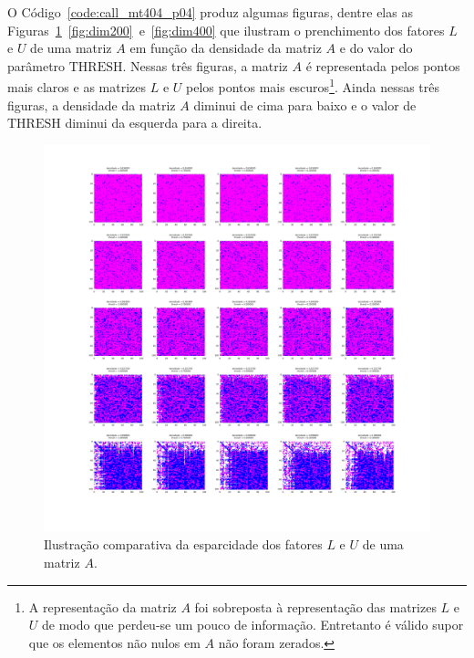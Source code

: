 \documentclass[12pt,a4paper]{article}
\begin{document}
O Código~\ref{code:call_mt404_p04} produz algumas figuras, dentre elas as
Figuras~\ref{fig:dim100}~\ref{fig:dim200}~e~\ref{fig:dim400} que ilustram o
prenchimento dos fatores $L$ e $U$ de uma matriz $A$ em função da densidade da
matriz $A$ e do valor do parâmetro $\mathrm{THRESH}$. Nessas três figuras, a
matriz $A$ é representada pelos pontos mais claros e as matrizes $L$ e $U$ pelos
pontos mais escuros\footnote{A representação da matriz $A$ foi sobreposta à
representação das matrizes $L$ e $U$ de modo que perdeu-se um pouco de
informação. Entretanto é válido supor que os elementos não nulos em $A$ não
foram zerados.}. Ainda nessas três figuras, a densidade da matriz $A$ diminui de
cima para baixo e o valor de $\mathrm{THRESH}$ diminui da esquerda para a
direita.
\begin{figure}[!htb]
    \begin{center}
        \includegraphics[width=\textwidth, trim=300 300 250 100, clip]{src/dim100.png}
    \end{center}
    \caption{Ilustração comparativa da esparcidade dos fatores $L$ e $U$ de uma
    matriz $A$.}
    \label{fig:dim100}
\end{figure}
\end{document}
